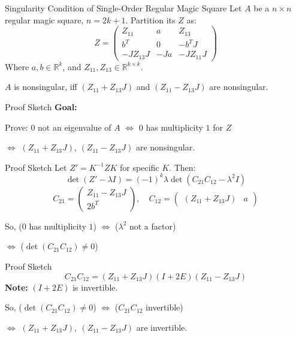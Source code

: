 \documentclass[10pt]{beamer}
\begin{document}
\begin{frame}{Singularity Condition of Single-Order Regular Magic Square}
    Let $A$ be a $n\times n$ regular magic square, $n=2k+1$. Partition its $Z$ as:
    $$Z=\begin{pmatrix}
            Z_{11} & a & Z_{13}\\ b^T&0&-b^TJ\\ -JZ_{13}J & -Ja & -JZ_{11}J
        \end{pmatrix}$$
    Where $a,b\in\mathbb{R}^k$, and $Z_{11}, Z_{13}\in\mathbb{R}^{k\times k}$.

    \hfil

    \begin{theorem}
        $A$ is nonsingular, iff $(Z_{11}+Z_{13}J)$ and $(Z_{11}-Z_{13}J)$ are nonsingular.
    \end{theorem}
\end{frame}
\begin{frame}{Proof Sketch}
    \textbf{Goal:}

    Prove: $0$ not an eigenvalue of $A$ $\iff$ $0$ has multiplicity $1$ for $Z$

    $\iff$ $(Z_{11}+Z_{13}J)$, $(Z_{11}-Z_{13}J)$ are nonsingular.
\end{frame}
\begin{frame}{Proof Sketch}
    Let $Z'=K^{-1}ZK$ for specific $K$. Then:
    $$\det(Z'-\lambda I)=(-1)^k\lambda \det(C_{21}C_{12}-\lambda^2 I)$$
    $$C_{21}=\begin{pmatrix}
        Z_{11}-Z_{13}J\\2b^T
    \end{pmatrix},\quad C_{12}=\begin{pmatrix}
        (Z_{11}+Z_{13}J) & a
    \end{pmatrix}$$

    \hfil

    So, ($0$ has multiplicity $1$) $\iff$ ($\lambda^2$ not a factor)

    $\iff$ ($\det(C_{21}C_{12})\neq 0$)
\end{frame}
\begin{frame}{Proof Sketch}
    \[C_{21}C_{12}=(Z_{11}+Z_{13}J)(I+2E)(Z_{11}-Z_{13}J)\]
    \textbf{Note:} $(I+2E)$ is invertible.

    \hfil

    So, ($\det(C_{21}C_{12})\neq 0$) $\iff$ ($C_{21}C_{12}$ invertible)

    $\iff$ $(Z_{11}+Z_{13}J),\ (Z_{11}-Z_{13}J)$ are invertible.
\end{frame}
\end{document}
